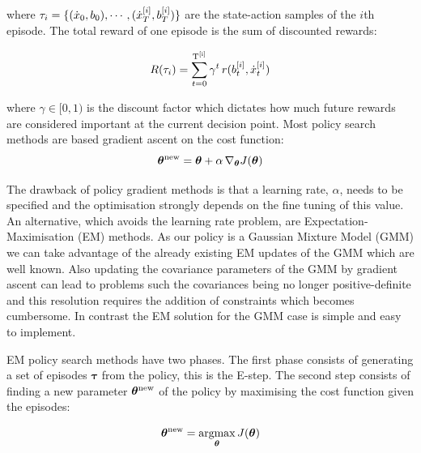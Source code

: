\begin{appendices}
where $\tau_i = \{(\dot{x}_0,b_0),\cdots,(\dot{x}_T^{[i]},b_T^{[i]}) \}$ are the state-action samples of the $i$th episode. 
The total reward of one episode is the sum of discounted rewards:

\begin{equation}
 R(\tau_i) = \sum_{t=0}^{\mathrm{T^{[i]}}} \gamma^t \, r(b^{[i]}_t,\dot{x}^{[i]}_t)
\end{equation}

where $\gamma \in [0,1)$ is the discount factor which dictates how much future rewards are considered important 
at the current decision point.
Most policy search methods are based gradient ascent on the cost function:
\begin{equation}
   \boldsymbol{\theta}^{\mathrm{new}} =  \boldsymbol{\theta} + \alpha\,\nabla_{\boldsymbol{\theta}}J(\boldsymbol{\theta})
\end{equation}

The drawback of policy gradient methods is that a learning rate, $\alpha$, needs to be specified and the optimisation strongly depends 
on the fine tuning of this value. An alternative, which avoids
the learning rate problem, are Expectation-Maximisation (EM) methods. As our policy is a Gaussian Mixture Model (GMM) we can take advantage of 
the already existing EM updates of the GMM which are well known. Also updating the covariance parameters of the GMM by gradient ascent can lead 
to problems such the covariances being no longer positive-definite and this resolution requires the addition of constraints which becomes 
cumbersome. In contrast the EM solution for the GMM case is simple and easy to implement.

EM policy search methods have two phases. The first phase consists of generating a set of episodes $\boldsymbol{\tau}$ from 
the policy, this is the E-step. The second step consists of finding a new parameter $\boldsymbol{\theta}^{\mathrm{new}}$ of the policy 
by maximising the cost function given the episodes:

\begin{equation}
  \Param^{\mathrm{new}} = \argmax\limits_{\Param} J(\Param) \label{eq:ch4:argmax}
\end{equation}


\end{appendices}
